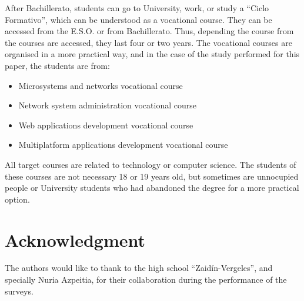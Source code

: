 \documentclass[journal,transmag]{IEEEtran}
\begin{document}
After Bachillerato, students can go to University, work, or study a ``Ciclo Formativo'', which can be understood as a vocational course. They can be accessed from the E.S.O. or from Bachillerato. Thus, depending the course from the courses are accessed, they last four or two years. The vocational courses are organised in a more practical way, and in the case of the study performed for this paper, the students are from:

\begin{itemize}
  \item Microsystems and networks vocational course
  \item Network system administration vocational course
  \item Web applications development vocational course
  \item Multiplatform applications development vocational course
\end{itemize}

All target courses are related to technology or computer science. The students of these courses are not necessary 18 or 19 years old, but sometimes are unnocupied people or University students who had abandoned the degree for a more practical option.

\section*{Acknowledgment}

The authors would like to thank to the high school ``Zaid\'{i}n-Vergeles'', and specially Nuria Azpeitia, for their collaboration during the performance of the surveys.


\ifCLASSOPTIONcaptionsoff
  \newpage
\fi





%
%
%


\end{document}
